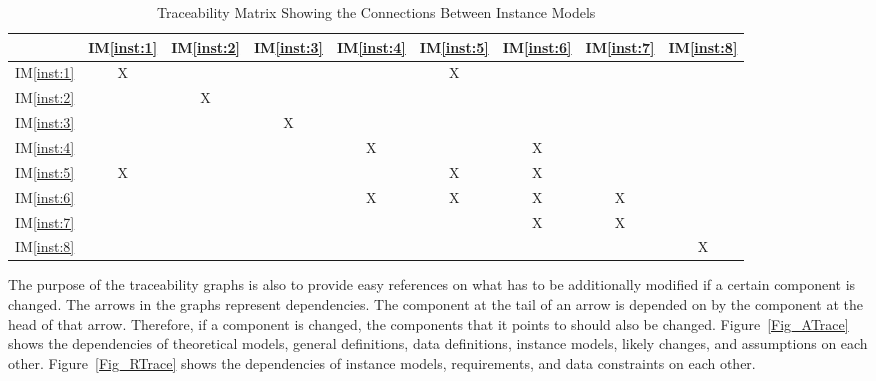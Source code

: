 \documentclass[12pt]{article}
\newcommand{\iref}[1]{IM\ref{#1}}
\begin{document}
\begin{table}[h!]
\centering
\begin{tabular}{|c|c|c|c|c|c|c|c|c|}
\hline
	& \iref{inst:1} & \iref{inst:2}& \iref{inst:3} & \iref{inst:4} & \iref{inst:5} & \iref{inst:6}& \iref{inst:7}& \iref{inst:8}\\
\hline
\iref{inst:1}       &X& & & &X& & &  \\ \hline
\iref{inst:2}       & &X& & & & & &  \\ \hline
\iref{inst:3}       & & &X& & & & &  \\ \hline
\iref{inst:4}       & & & &X& &X& &  \\ \hline
\iref{inst:5}       &X& & & &X&X& &  \\ \hline
\iref{inst:6}       & & & &X&X&X&X&  \\ \hline
\iref{inst:7}       & & & & & &X&X&  \\ \hline
\iref{inst:8}       & & & & & & & &X \\ \hline
\end{tabular}
\caption{Traceability Matrix Showing the Connections Between Instance Models}
\label{Table:trace_IM}
\end{table}


The purpose of the traceability graphs is also to provide easy references on
what has to be additionally modified if a certain component is changed.  The
arrows in the graphs represent dependencies. The component at the tail of an
arrow is depended on by the component at the head of that arrow. Therefore, if a
component is changed, the components that it points to should also be
changed. Figure~\ref{Fig_ATrace} shows the dependencies of theoretical models,
general definitions, data definitions, instance models, likely changes, and
assumptions on each other. Figure~\ref{Fig_RTrace} shows the dependencies of
instance models, requirements, and data constraints on each other.



\end{document}
